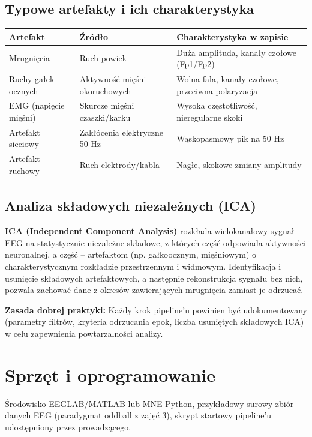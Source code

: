 \documentclass[11pt,a4paper]{article}
\newcommand{\infobox}[1]{%
  \par\noindent\colorbox{lgray}{\parbox{\dimexpr\linewidth-2\fboxsep}{\vspace{2pt}#1\vspace{2pt}}}\par\vspace{4pt}}
\begin{document}
\subsection{Typowe artefakty i ich charakterystyka}
\begin{center}
\begin{tabular}{@{}lll@{}}
\toprule
\textbf{Artefakt} & \textbf{Źródło} & \textbf{Charakterystyka w zapisie}\\
\midrule
Mrugnięcia & Ruch powiek & Duża amplituda, kanały czołowe (Fp1/Fp2)\\
Ruchy gałek ocznych & Aktywność mięśni okoruchowych & Wolna fala, kanały czołowe, przeciwna polaryzacja\\
EMG (napięcie mięśni) & Skurcze mięśni czaszki/karku & Wysoka częstotliwość, nieregularne skoki\\
Artefakt sieciowy & Zakłócenia elektryczne 50 Hz & Wąskopasmowy pik na 50 Hz\\
Artefakt ruchowy & Ruch elektrody/kabla & Nagłe, skokowe zmiany amplitudy\\
\bottomrule
\end{tabular}
\end{center}

\subsection{Analiza składowych niezależnych (ICA)}
\textbf{ICA (Independent Component Analysis)} rozkłada wielokanałowy sygnał EEG na statystycznie niezależne składowe, z których część odpowiada aktywności neuronalnej, a część -- artefaktom (np. gałkoocznym, mięśniowym) o charakterystycznym rozkładzie przestrzennym i widmowym. Identyfikacja i usunięcie składowych artefaktowych, a następnie rekonstrukcja sygnału bez nich, pozwala zachować dane z okresów zawierających mrugnięcia zamiast je odrzucać.

\infobox{\textbf{Zasada dobrej praktyki:} Każdy krok pipeline'u powinien być udokumentowany (parametry filtrów, kryteria odrzucania epok, liczba usuniętych składowych ICA) w celu zapewnienia powtarzalności analizy.}

\section{Sprzęt i oprogramowanie}
Środowisko EEGLAB/MATLAB lub MNE-Python, przykładowy surowy zbiór danych EEG (paradygmat oddball z zajęć 3), skrypt startowy pipeline'u udostępniony przez prowadzącego.
\end{document}
